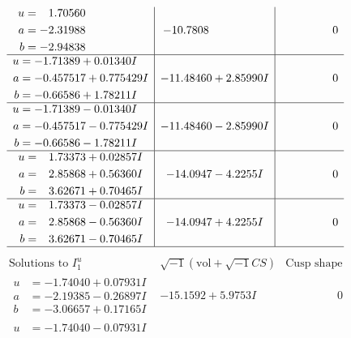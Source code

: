 \documentclass[1p]{elsarticle_modified}
\theoremstyle{definition}
\newcommand{\I}{\sqrt{-1}}
\begin{document}
$$\begin{array}{c|c|c}
\begin{aligned}
u &= \phantom{-}1.70560\phantom{ +0.000000I} \\
a &= -2.31988\phantom{ +0.000000I} \\
b &= -2.94838\phantom{ +0.000000I}\end{aligned}
 & -10.7808\phantom{ +0.000000I} & \phantom{-0.000000 } 0 \\ \hline\begin{aligned}
u &= -1.71389 + 0.01340 I \\
a &= -0.457517 + 0.775429 I \\
b &= -0.66586 + 1.78211 I\end{aligned}
 & -11.48460 + 2.85990 I & \phantom{-0.000000 } 0 \\ \hline\begin{aligned}
u &= -1.71389 - 0.01340 I \\
a &= -0.457517 - 0.775429 I \\
b &= -0.66586 - 1.78211 I\end{aligned}
 & -11.48460 - 2.85990 I & \phantom{-0.000000 } 0 \\ \hline\begin{aligned}
u &= \phantom{-}1.73373 + 0.02857 I \\
a &= \phantom{-}2.85868 + 0.56360 I \\
b &= \phantom{-}3.62671 + 0.70465 I\end{aligned}
 & -14.0947 - 4.2255 I & \phantom{-0.000000 } 0 \\ \hline\begin{aligned}
u &= \phantom{-}1.73373 - 0.02857 I \\
a &= \phantom{-}2.85868 - 0.56360 I \\
b &= \phantom{-}3.62671 - 0.70465 I\end{aligned}
 & -14.0947 + 4.2255 I & \phantom{-0.000000 } 0\\
 \hline 
 \end{array}$$\newpage$$\begin{array}{c|c|c}  
\text{Solutions to }I^u_{1}& \I (\text{vol} + \sqrt{-1}CS) & \text{Cusp shape}\\
 \hline 
\begin{aligned}
u &= -1.74040 + 0.07931 I \\
a &= -2.19385 - 0.26897 I \\
b &= -3.06657 + 0.17165 I\end{aligned}
 & -15.1592 + 5.9753 I & \phantom{-0.000000 } 0 \\ \hline\begin{aligned}
u &= -1.74040 - 0.07931 I \\

\end{aligned}
\end{array}$$
\end{document}

